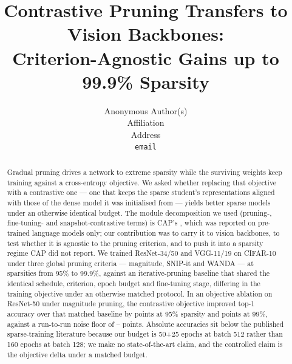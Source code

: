 \documentclass{article}
\title{Contrastive Pruning Transfers to Vision Backbones:\\
       Criterion-Agnostic Gains up to 99.9\% Sparsity}
\author{%
  Anonymous Author(s) \\
  Affiliation \\
  Address \\
  \texttt{email} \\
}
\begin{document}
\maketitle

\begin{abstract}
Gradual pruning drives a network to extreme sparsity while the surviving
weights keep training against a cross-entropy objective. We asked whether
replacing that objective with a contrastive one --- one that keeps the sparse
student's representations aligned with those of the dense model it was
initialised from --- yields better sparse models under an otherwise identical
budget. The module decomposition we used (pruning-, fine-tuning- and
snapshot-contrastive terms) is CAP's \citep{xu2022cap}, which was reported on
pre-trained language models only; our contribution was to carry it to vision
backbones, to test whether it is agnostic to the pruning criterion, and to push
it into a sparsity regime CAP did not report. We trained ResNet-34/50 and
VGG-11/19 on CIFAR-10 under three global pruning criteria --- magnitude,
SNIP-it and WANDA --- at sparsities from 95\% to 99.9\%, against an
iterative-pruning baseline that shared the identical schedule, criterion, epoch
budget and fine-tuning stage, differing in the training objective under an
otherwise matched protocol. In an objective ablation on ResNet-50 under magnitude pruning, the
contrastive objective improved top-1 accuracy over that matched baseline by
 points at 95\% sparsity and
 points at 99\%, against a
run-to-run noise floor of --%
 points. Absolute accuracies sit below the
published sparse-training literature because our budget is 50+25 epochs at
batch 512 rather than 160 epochs at batch 128; we make no state-of-the-art
claim, and the controlled claim is the objective delta under a matched budget.
\end{abstract}

\newcommand{\inputsection}[1]{%
  \IfFileExists{sections/#1.tex}{}{%
    \par\noindent\textcolor{red}{\textbf{[MISSING SECTION FILE:
    \texttt{\detokenize{sections/#1.tex}}]}}\par}%
}
\end{document}
